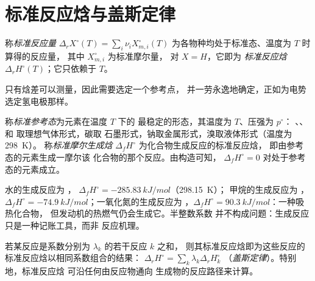 \section{标准反应焓与盖斯定律}

\begin{definition}[标准反应量]\label{def:b2:reaction-enthalpy:standard-reaction-enthalpy}
称\emph{标准反应量}
$\Delta_r X^\circ(T) = \sum_i\nu_iX_{m,i}^\circ(T)$ 为各物种均处于标准态、温度为 $T$ 时算得的反应量，
其中 $X_{m,i}^\circ$ 为标准摩尔量，
对 $X = H$，它即为
\emph{标准反应焓}
$\Delta_r H^\circ(T)$；它只依赖于 $T$。
\end{definition}

只有焓差可以测量，因此需要选定一个参考点，
并一劳永逸地确定，正如为电势选定氢电极那样。

\begin{definition}\label{def:b2:reaction-enthalpy:formation}
称\emph{标准参考态}为元素在温度 $T$ 下的
最稳定的形态，其温度为 $T$、压强为 $p^\circ$：
、、 和  取理想气体形式，碳取
石墨形式，钠取金属形式，溴取液体形式（温度为 \qty{298}{K}）。
称\emph{标准摩尔生成焓}
$\Delta_f H^\circ$ 为化合物生成反应的标准反应焓，
即由参考态的元素生成一摩尔该
化合物的那个反应。由构造可知，
$\Delta_f H^\circ = 0$ 对处于参考态的元素成立。
\end{definition}

\begin{example}[生成反应]\label{ex:b2:reaction-enthalpy:formation}
水的生成反应为 ，
$\Delta_f H^\circ = \qty{-285.83}{kJ/mol}$（\qty{298.15}{K}）；
甲烷的生成反应为 ，$\Delta_f H^\circ =
\qty{-74.9}{kJ/mol}$；一氧化氮的生成反应为 ，$\Delta_f H^\circ = \qty{+90.3}{kJ/mol}$：一种吸热化合物，
但发动机的热燃气仍会生成它。半整数系数
并不构成问题：生成反应只是一种记账工具，而非
反应机理。
\end{example}

\begin{theorem}[盖斯定律]\label{thm:b2:reaction-enthalpy:hess}
若某反应是系数分别为 $\lambda_k$ 的若干反应 $k$ 之和，
则其标准反应焓即为这些反应的标准反应焓以相同系数组合的结果：
$\Delta_r H^\circ = \sum_k\lambda_k\Delta_r H_k^\circ$
（\emph{盖斯定律}）。特别地，标准反应焓
可沿任何由反应物通向
生成物的反应路径来计算。
\end{theorem}

